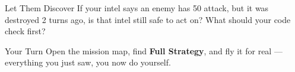 \documentclass[aspectratio=169]{beamer}
\begin{document}
\begin{frame}{Let Them Discover}
    \large
    If your intel says an enemy has 50 attack, but it was destroyed 2 turns ago, is that intel still safe to act on? What should your code check first?
\end{frame}

\begin{frame}{Your Turn}
    \Large
    Open the mission map, find \textbf{Full Strategy}, and fly it for real ---
    everything you just saw, you now do yourself.
\end{frame}
\end{document}
